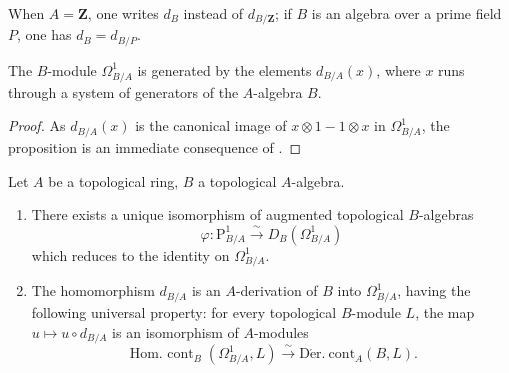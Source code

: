 When $A=\mathbf{Z}$, one writes $d_B$ instead of $d_{B/\mathbf{Z}}$; if $B$ is an algebra over a prime field $P$, one has $d_B=d_{B/P}$.

\begin{proposition}[20.4.7]
\label{0.20.4.7}
The $B$-module $\Omega^1_{B/A}$ is generated by the elements $d_{B/A}(x)$, where $x$ runs through a system of generators of the $A$-algebra $B$.
\end{proposition}

\begin{proof}
As $d_{B/A}(x)$ is the canonical image of $x\otimes 1-1\otimes x$ in $\Omega^1_{B/A}$, the proposition is an immediate consequence of .
\end{proof}

\begin{theorem}[20.4.8]
\label{0.20.4.8}
Let $A$ be a topological ring, $B$ a topological $A$-algebra.
\begin{enumerate}
  \item[\rm(i)] There exists a unique isomorphism of augmented topological $B$-algebras
\begin{equation}
\tag{20.4.8.1}
  \label{0.20.4.8.1}
  \varphi:\mathrm{P}^1_{B/A}\xrightarrow{\sim}D_B(\Omega^1_{B/A})
\end{equation}
which reduces to the identity on $\Omega^1_{B/A}$.
  \item[\rm(ii)] The homomorphism $d_{B/A}$ is an $A$-derivation of $B$ into $\Omega^1_{B/A}$, having the following universal property: for every topological $B$-module $L$, the map $u\mapsto u\circ d_{B/A}$ is an isomorphism of $A$-modules
\begin{equation}
\tag{20.4.8.2}
  \label{0.20.4.8.2}
  \operatorname{Hom.\ cont}_B(\Omega^1_{B/A},L)\xrightarrow{\sim}\operatorname{D\acute{e}r.\ cont}_A(B,L).
\end{equation}
\end{enumerate}
\end{theorem}

